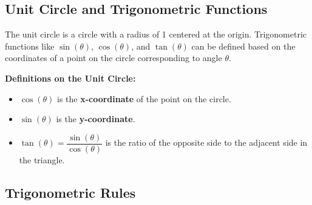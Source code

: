 \subsection{Unit Circle and Trigonometric Functions}

The unit circle is a circle with a radius of 1 centered at the origin. Trigonometric functions like \(\sin(\theta)\), \(\cos(\theta)\), and \(\tan(\theta)\) can be defined based on the coordinates of a point on the circle corresponding to angle \(\theta\).

\begin{center}
\end{center}

\textbf{Definitions on the Unit Circle:}
\begin{itemize}[label=\(-\)]
    \item \(\cos(\theta)\) is the \textbf{x-coordinate} of the point on the circle.
    \item \(\sin(\theta)\) is the \textbf{y-coordinate}.
    \item \(\tan(\theta) = \dfrac{\sin(\theta)}{\cos(\theta)}\) is the ratio of the opposite side to the adjacent side in the triangle.
\end{itemize}


\subsection{Trigonometric Rules}

